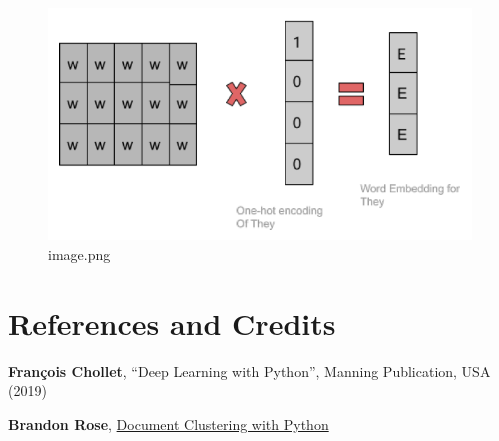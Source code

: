 \documentclass[11pt]{article}
\begin{document}
    

    \begin{figure}
\centering
\includegraphics{./img/word-embedding-2.png}
\caption{image.png}
\end{figure}

    \hypertarget{references-and-credits}{%
\section{References and Credits}\label{references-and-credits}}

\textbf{François Chollet}, ``Deep Learning with Python'', Manning
Publication, USA (2019)

\textbf{Brandon Rose},
\href{Document\%20Clustering\%20with\%20Python}{Document Clustering with
Python}


    
    
    
\end{document}
